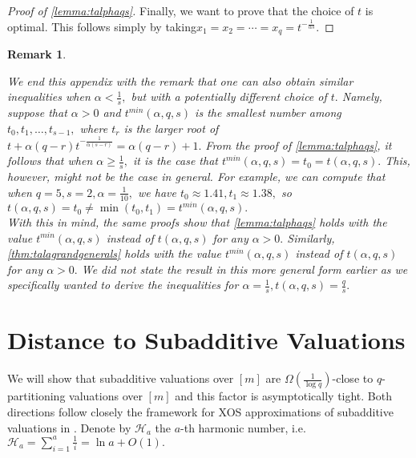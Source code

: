 \documentclass[11pt]{article}%
\newtheorem{remark}[theorem]{Remark}
\numberwithin{theorem}{subsection}
\begin{document}
\begin{proof}[Proof of \cref{lemma:talphaqs}]
\noindent
Finally, we want to prove that the choice of $t$ is optimal. This follows simply by taking\linebreak $x_1 = x_2 = \cdots = x_q = t^{-\frac{1}{\alpha s}}.$ 
\end{proof}

\begin{remark}
\label{rmk:alphalessthansiso}
\normalfont

We end this appendix with the remark that one can also obtain similar inequalities when $\alpha <\frac{1}{s},$ but with a potentially different choice of $t.$ Namely, suppose that $\alpha >0$ and $t^{min}(\alpha ,q,s)$ is the smallest number among $t_0,t_1,\ldots, t_{s-1},$ where $t_r$ is the larger root of\linebreak $t + \alpha (q-r)t^{-\frac{1}{\alpha (s-r)}} = \alpha (q-r)+1.$ From the proof of \cref{lemma:talphaqs}, it follows that 
when $\alpha \ge\frac{1}{s},$ it is the case that $t^{min}(\alpha ,q,s) =t_0 = t(\alpha, q, s).$ This, however, might not be the case in general. For example, we can compute that when $q = 5, s = 2, \alpha = \frac{1}{10},$
we have $t_0 \approx 1.41, t_1\approx 1.38,$ so $t(\alpha ,q,s) = t_0\neq \min(t_0,t_1) = t^{min}(\alpha,q,s).$\\
 
\noindent
With this in mind, the same proofs show that \cref{lemma:talphaqs} holds with the value $t^{min}(\alpha,q,s)$ instead of $t(\alpha,q,s)$ for any $\alpha >0.$ Similarly,
\cref{thm:talagrandgenerals} holds 
with the value $t^{min}(\alpha,q,s)$ instead of $t(\alpha,q,s)$ for any $\alpha >0.$ We did not state the result in this more general form earlier as we specifically wanted to derive the inequalities for $\alpha = \frac{1}{s}, t(\alpha,q,s) = \frac{q}{s}.$ 
\end{remark}
\section{Distance to Subadditive Valuations}
\label{section:closeness}
We will show that subadditive valuations over $[m]$ are $\Omega(\frac{1}{\log q})$-close to $q$-partitioning valuations over $[m]$ and this factor is asymptotically tight. Both directions follow closely the framework for XOS 
approximations of subadditive valuations in \cite{BhawalkarR11}. Denote by $\mathcal{H}_a$ the $a$-th harmonic number, i.e. $\displaystyle\mathcal{H}_a = \sum_{i = 1}^a\frac{1}{i} = \ln a + O(1).$
\end{document}
